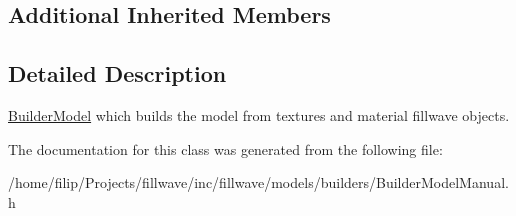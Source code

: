 \subsection*{Additional Inherited Members}


\subsection{Detailed Description}
\hyperlink{classflw_1_1flf_1_1BuilderModel}{Builder\+Model} which builds the model from textures and material fillwave objects. 

The documentation for this class was generated from the following file\+:\begin{DoxyCompactItemize}
\item 
/home/filip/\+Projects/fillwave/inc/fillwave/models/builders/Builder\+Model\+Manual.\+h\end{DoxyCompactItemize}
